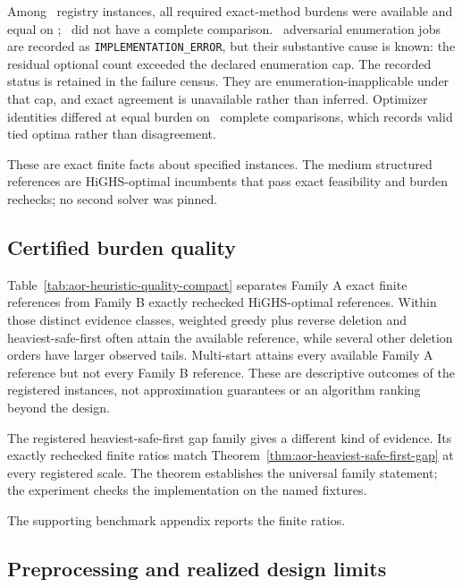 Among \AORExactCapable\ registry instances, all required exact-method burdens
were available and equal on \AORExactAgreement; \AORExactUnavailable\ did not
have a complete comparison. \AORImplementationErrors\ adversarial enumeration
jobs are recorded as
\texttt{IMPLEMENTATION\_ERROR}, but their substantive cause is known: the
residual optional count exceeded the declared enumeration cap. The recorded status is retained in the failure census. They are enumeration-inapplicable under that cap,
and exact agreement is unavailable rather than inferred. Optimizer identities
differed at equal burden on \AOROptimizerIdentityDifferences\ complete
comparisons, which records valid tied optima rather than disagreement.

These are exact finite facts about specified instances. The medium structured
references are HiGHS-optimal incumbents that pass exact feasibility and burden
rechecks; no second solver was pinned.

\subsection{Certified burden quality}

Table~\ref{tab:aor-heuristic-quality-compact} separates Family A exact finite
references from Family B exactly rechecked HiGHS-optimal references. Within
those distinct evidence classes, weighted greedy plus reverse deletion and
heaviest-safe-first often attain the available reference, while several other
deletion orders have larger observed tails. Multi-start attains every available
Family A reference but not every Family B reference. These are descriptive
outcomes of the registered instances, not approximation guarantees or an
algorithm ranking beyond the design.

\AORHeuristicQualityTable

The registered heaviest-safe-first gap family gives a different kind of
evidence. Its exactly rechecked finite ratios match
Theorem~\ref{thm:aor-heaviest-safe-first-gap} at every registered scale. The
theorem establishes the universal family statement; the experiment checks the
implementation on the named fixtures.

The supporting benchmark appendix reports the finite ratios.

\subsection{Preprocessing and realized design limits}

